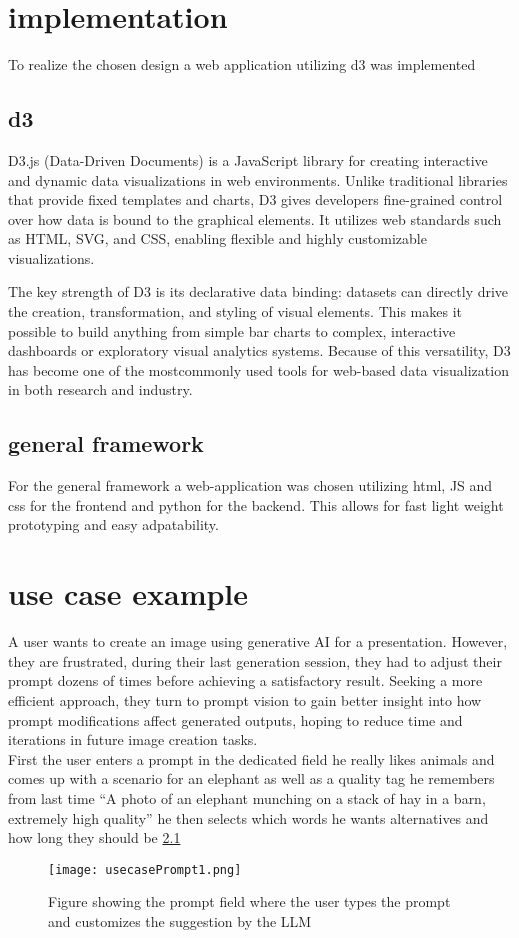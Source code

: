 \documentclass[
  a4paper,  %
  twoside,  %
  bibliography=totoc,
  headsepline,
  cleardoublepage=empty,
  parskip=half,
  draft=false
]{scrbook}
\begin{document}
\chapter{implementation}
To realize the chosen design a web application utilizing d3 was implemented
\section{d3}
D3.js (Data-Driven Documents) is a JavaScript library for creating interactive and dynamic data visualizations in web environments. Unlike traditional libraries that provide fixed templates and charts, D3 gives developers fine-grained control over how data is bound to the graphical elements. It utilizes web standards such as HTML, SVG, and CSS, enabling flexible and highly customizable visualizations.

The key strength of D3 is its declarative data binding: datasets can directly drive the creation, transformation, and styling of visual elements. This makes it possible to build anything from simple bar charts to complex, interactive dashboards or exploratory visual analytics systems. Because of this versatility, D3 has become one of the mostcommonly used tools for web-based data visualization in both research and industry.

\section{general framework}
For the general framework a web-application was chosen utilizing html, JS and css for the frontend and python for the backend.
This allows for fast light weight prototyping and easy adpatability. 
\chapter{use case example}
A user wants to create an image using generative AI for a presentation. However, they are frustrated, during their last generation session, they had to adjust their prompt dozens of times before achieving a satisfactory result. Seeking a more efficient approach, they turn to prompt vision to gain better insight into how prompt modifications affect generated outputs, hoping to reduce time and iterations in future image creation tasks.\\
First the user enters a prompt in the dedicated field he really likes animals and comes up with a scenario for an elephant as well as a quality tag he remembers from last time \enquote{A photo of an elephant munching on a stack of hay in a barn, extremely high quality} he then selects which words he wants alternatives and how long they should be \cref{fig:usecasePrompt1}
\begin{figure}[H]
	\centering
	\texttt{[image: usecasePrompt1.png]}
	\caption{Figure showing the prompt field where the user types the prompt and customizes the suggestion by the LLM}
	\label{fig:usecasePrompt1}
\end{figure}
\end{document}
